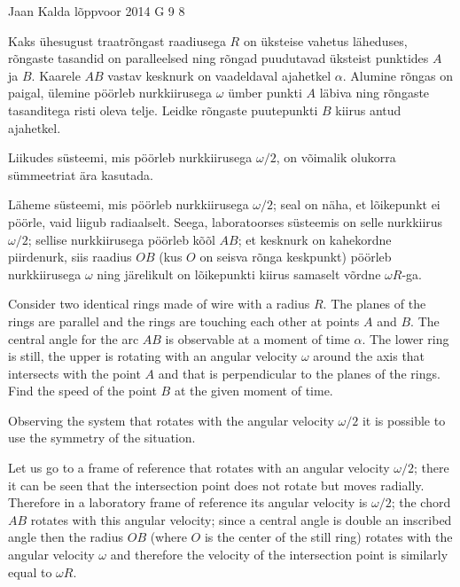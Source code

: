 {Jaan Kalda} %
{lõppvoor} %
{2014} %
{G 9} %
{8} %
{
\ifStatement
Kaks ühesugust traatrõngast raadiusega $R$ on üksteise vahetus läheduses, rõngaste tasandid on paralleelsed ning rõngad puudutavad üksteist punktides $A$ ja $B$. Kaarele $AB$ vastav kesknurk on vaadeldaval ajahetkel $\alpha$. Alumine rõngas on paigal, ülemine pöörleb nurkkiirusega $\omega$ ümber punkti $A$ läbiva ning rõngaste tasanditega risti oleva telje. Leidke rõngaste puutepunkti $B$ kiirus antud ajahetkel.
\fi


\ifHint
Liikudes süsteemi, mis pöörleb nurkkiirusega $\omega/2$, on võimalik olukorra sümmeetriat ära kasutada.
\fi


\ifSolution
Läheme süsteemi, mis pöörleb nurkkiirusega $\omega/2$; seal on näha, et lõikepunkt ei pöörle, vaid liigub radiaalselt.
Seega, laboratoorses süsteemis on selle nurkkiirus $\omega/2$; sellise nurkkiirusega pöörleb kõõl $AB$; et kesknurk on kahekordne piirdenurk, siis 
raadius $OB$ (kus $O$ on seisva rõnga keskpunkt) pöörleb nurkkiirusega $\omega$ ning järelikult on lõikepunkti kiirus samaselt võrdne $\omega R$-ga.
\fi


\ifEngStatement
Consider two identical rings made of wire with a radius $R$. The planes of the rings are parallel and the rings are touching each other at points $A$ and $B$. The central angle for the arc $AB$ is observable at a moment of time $\alpha$. The lower ring is still, the upper is rotating with an angular velocity $\omega$ around the axis that intersects with the point $A$ and that is perpendicular to the planes of the rings. Find the speed of the point $B$ at the given moment of time.
\fi


\ifEngHint
Observing the system that rotates with the angular velocity $\omega/2$ it is possible to use the symmetry of the situation.
\fi


\ifEngSolution
Let us go to a frame of reference that rotates with an angular velocity $\omega/2$; there it can be seen that the intersection point does not rotate but moves radially. Therefore in a laboratory frame of reference its angular velocity is $\omega/2$; the chord $AB$ rotates with this angular velocity; since a central angle is double an inscribed angle then the radius $OB$ (where $O$ is the center of the still ring) rotates with the angular velocity $\omega$ and therefore the velocity of the intersection point is similarly equal to $\omega R$.
\fi
}